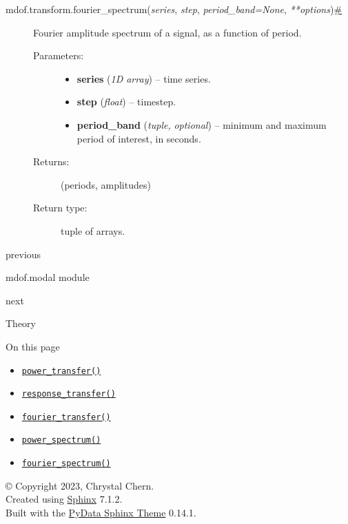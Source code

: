 \begin{description}
\item[{ {{mdof.transform.}}{{fourier\_spectrum}}{(}\emph{{{series}}},
\emph{{{step}}}, \emph{{{period\_band}}{{=}}{{None}}},
\emph{{{**}}{{options}}}{)}\protect\hyperlink{mdof.transform.fourier_spectrum}{\#}}]
Fourier amplitude spectrum of a signal, as a function of period.

\begin{description}
\item[Parameters{:}]
\begin{itemize}
\item
  \textbf{series} (\emph{1D array}) -- time series.
\item
  \textbf{step} (\emph{float}) -- timestep.
\item
  \textbf{period\_band} (\emph{tuple,} \emph{optional}) -- minimum and
  maximum period of interest, in seconds.
\end{itemize}
\item[Returns{:}]
(periods, amplitudes)
\item[Return type{:}]
tuple of arrays.
\end{description}
\end{description}

\href{mdof.modal.html}{\emph{}}

previous

mdof.modal module

\href{../theory/index.html}{}

next

Theory

\emph{}

\emph{} On this page

\begin{itemize}
\tightlist
\item
  \protect\hyperlink{mdof.transform.power_transfer}{\texttt{power\_transfer()}}
\item
  \protect\hyperlink{mdof.transform.response_transfer}{\texttt{response\_transfer()}}
\item
  \protect\hyperlink{mdof.transform.fourier_transfer}{\texttt{fourier\_transfer()}}
\item
  \protect\hyperlink{mdof.transform.power_spectrum}{\texttt{power\_spectrum()}}
\item
  \protect\hyperlink{mdof.transform.fourier_spectrum}{\texttt{fourier\_spectrum()}}
\end{itemize}

© Copyright 2023, Chrystal Chern.\\

Created using \href{https://www.sphinx-doc.org/}{Sphinx} 7.1.2.\\

Built with the
\href{https://pydata-sphinx-theme.readthedocs.io/en/stable/index.html}{PyData
Sphinx Theme} 0.14.1.
